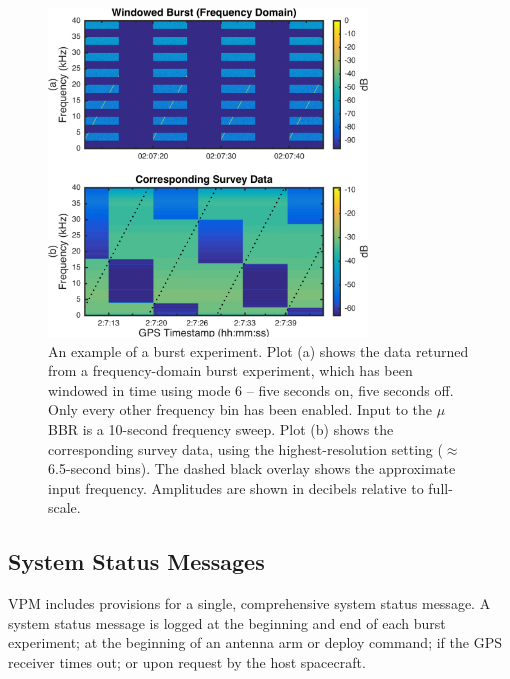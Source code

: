 \begin{figure}[t]
\begin{center}
\includegraphics[width=20pc]{figures/vpm_figures/burst_example.png}
\caption[Example of a frequency-domain burst experiment and corresponding survey data]{An example of a burst experiment. Plot (a) shows the data returned from a frequency-domain burst experiment, which has been windowed in time using mode 6 -- five seconds on, five seconds off. Only every other frequency bin has been enabled. Input to the $\mu$BBR is a 10-second frequency sweep. Plot (b) shows the corresponding survey data, using the highest-resolution setting ($\approx$ 6.5-second bins). The dashed black overlay shows the approximate input frequency. Amplitudes are shown in decibels relative to full-scale.}
\label{fig:example_data}
\end{center}
\end{figure}


\subsection{System Status Messages}
VPM includes provisions for a single, comprehensive system status message. A system status message is logged at the beginning and end of each burst experiment; at the beginning of an antenna arm or deploy command; if the GPS receiver times out; or upon request by the host spacecraft.

